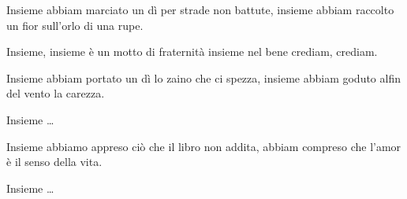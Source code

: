 
\beginverse

Insieme abbiam marciato un dì
per strade non battute,
insieme abbiam raccolto un fior
sull'orlo di una rupe.

\endverse

\beginchorus

Insieme, insieme è un motto di fraternità
insieme nel bene crediam, crediam.

\endchorus

\chordsoff

\beginverse

Insieme abbiam portato un dì
lo zaino che ci spezza,
insieme abbiam goduto alfin
del vento la carezza.

\endverse

\beginchorus 

Insieme \dots

\endchorus

\beginverse

Insieme abbiamo appreso ciò
che il libro non addita,
abbiam compreso che l'amor
è il senso della vita.

\endverse


\beginchorus 

Insieme \dots

\endchorus

\endsong

